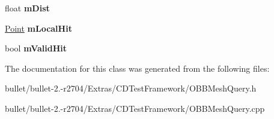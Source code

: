 \begin{DoxyCompactItemize}
\item 
\hypertarget{class_o_b_b_mesh_query_a592d9d525cbe8672e4f73cc99d663b10}{float {\bfseries m\+Dist}}\label{class_o_b_b_mesh_query_a592d9d525cbe8672e4f73cc99d663b10}

\item 
\hypertarget{class_o_b_b_mesh_query_aac5254a41f709bc6d7c699057aac4196}{\hyperlink{class_point}{Point} {\bfseries m\+Local\+Hit}}\label{class_o_b_b_mesh_query_aac5254a41f709bc6d7c699057aac4196}

\item 
\hypertarget{class_o_b_b_mesh_query_aa43da6fbe0be0c08b3b0bfce14cf144d}{bool {\bfseries m\+Valid\+Hit}}\label{class_o_b_b_mesh_query_aa43da6fbe0be0c08b3b0bfce14cf144d}

\end{DoxyCompactItemize}


The documentation for this class was generated from the following files\+:\begin{DoxyCompactItemize}
\item 
bullet/bullet-\/2.-\/r2704/\+Extras/\+C\+D\+Test\+Framework/O\+B\+B\+Mesh\+Query.\+h\item 
bullet/bullet-\/2.-\/r2704/\+Extras/\+C\+D\+Test\+Framework/O\+B\+B\+Mesh\+Query.\+cpp\end{DoxyCompactItemize}
